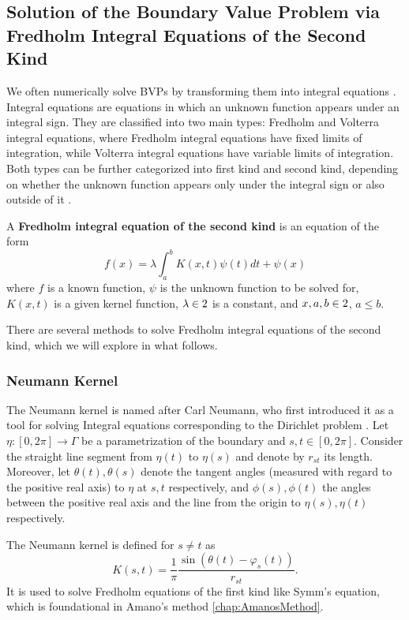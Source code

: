 \subsection{Solution of the Boundary Value Problem via Fredholm Integral Equations of the Second Kind}
We often numerically solve BVPs by transforming them into integral equations \cite[page 281]{Henrici1986_vol3}. Integral equations are equations in which an unknown function appears under an integral sign. 
They are classified into two main types: Fredholm and Volterra integral equations, where Fredholm integral equations have fixed limits of integration, while Volterra integral equations have variable limits of integration. Both types can be further categorized into first kind and second kind, depending on whether the unknown function appears only under the integral sign or also outside of it \cite[p. 284]{Henrici1986_vol3}.

\begin{definition}
    A \textbf{Fredholm integral equation of the second kind} is an equation of the form
    \begin{equation}\label{eq:FredholmSecondKind}
        f(x) = \lambda \int_{a}^{b} K(x,t) \psi(t) dt + \psi(x)
    \end{equation}
    where $f$ is a known function, $\psi$ is the unknown function to be solved for, $K(x,t)$ is a given kernel function, $\lambda\in2$ is a constant, and $x,a,b\in2$, $a\leq b$.
\end{definition}

There are several methods to solve Fredholm integral equations of the second kind, which we will explore in what follows.

\subsubsection{Neumann Kernel}
The Neumann kernel is named after Carl Neumann, who first introduced it as a tool for solving Integral equations corresponding to the Dirichlet problem \cite[§1.1c]{Gaier1964}.
Let $\eta:[0,2\pi]\to\Gamma$ be a parametrization of the boundary and $s,t\in[0,2\pi]$. Consider the straight line segment from $\eta(t)$ to $\eta(s)$ and denote by $r_{st}$ its length. Moreover, let $\theta(t), \theta(s)$ denote the tangent angles (measured with regard to the positive real axis) to $\eta$ at $s, t$ respectively, and $\phi(s), \phi(t)$ the angles between the positive real axis and the line from the origin to $\eta(s), \eta(t)$ respectively. 

The Neumann kernel is defined for $s \neq t$ as 
\begin{equation}\label{eq:NeumannKernel}
    K(s,t) = \frac{1}{\pi} \frac{\sin(\theta(t)-\varphi_s(t))}{r_{st}}.
\end{equation}
It is used to solve Fredholm equations of the first kind like Symm's equation, which is foundational in Amano's method \ref{chap:AmanosMethod}.

